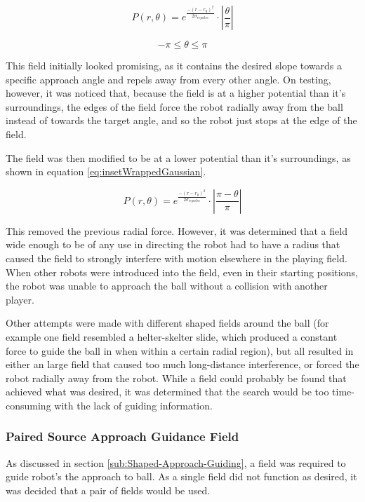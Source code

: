 \documentclass[10pt]{article}
\begin{document}
\begin{equation}
P\left(r,\theta\right)=e^{\frac{-\left(r-r_{0}\right)^{2}}{2\sigma_{repulse}}}\cdot\left|\frac{\theta}{\pi}\right|\label{eq:wrappedGaussian}
\end{equation}

\[
-\pi\leq\theta\leq\pi
\]

This field initially looked promising, as it contains the desired slope towards a specific approach angle and repels away from every other angle. On testing, however, it was noticed that, because the
field is at a higher potential than it's surroundings, the edges of the field force the robot radially away from the ball instead of towards the target angle, and so the robot just stops at the edge of the field.

The field was then modified to be at a lower potential than it's surroundings, as shown in equation \ref{eq:insetWrappedGaussian}.

\begin{equation}
P\left(r,\theta\right)=e^{\frac{-\left(r-r_{0}\right)^{2}}{2\sigma_{repulse}}}\cdot\left|\frac{\pi-\theta}{\pi}\right|\label{eq:insetWrappedGaussian}
\end{equation}

This removed the previous radial force. However, it was determined that a field wide enough to be of any use in directing the robot had to have a radius that caused the field to strongly interfere with motion elsewhere in the playing field. When other robots were introduced into the field, even in their starting positions, the robot was unable to approach the ball without a collision with another player.

Other attempts were made with different shaped fields around the ball (for example one field resembled a helter-skelter slide, which produced a constant force to guide the ball in when within a certain radial region), but all resulted in either an large field that caused too much long-distance interference, or forced the robot radially away from the robot. While a field could probably be found that achieved what was desired, it was determined that the search would be too time-consuming with the lack of guiding information.

\subsubsection{Paired Source Approach Guidance Field}

As discussed in section \ref{sub:Shaped-Approach-Guiding}, a field was required to guide robot's the approach to ball. As a single field did not function as desired, it was decided that a pair of fields would be used.
\end{document}
